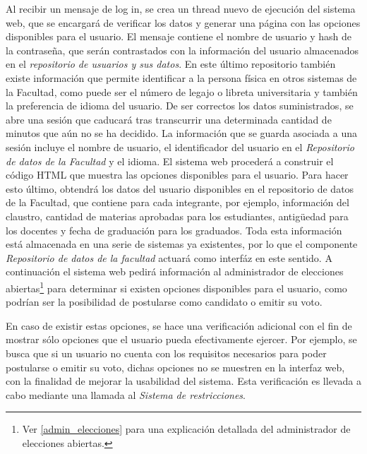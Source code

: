 Al recibir un mensaje de log in, se crea un thread nuevo de ejecución del sistema web, que se encargará de verificar los datos y generar una página con las opciones disponibles para el usuario. 
El mensaje contiene el nombre de usuario y hash de la contraseña, que serán contrastados con la información del usuario almacenados en el \emph{repositorio de usuarios y sus datos}. En este último repositorio también existe información que permite identificar a la persona física en otros sistemas de la Facultad, como puede ser el número de legajo o libreta universitaria y también la preferencia de idioma del usuario. 
De ser correctos los datos suministrados, se abre una sesión que caducará tras transcurrir una determinada cantidad de minutos que aún no se ha decidido.
La información que se guarda asociada a una sesión incluye el nombre de usuario, el identificador del usuario en el \emph{Repositorio de datos de la Facultad} y el idioma.
El sistema web procederá a construir el código HTML que muestra las opciones disponibles para el usuario. Para hacer esto último, obtendrá los datos del usuario disponibles en el repositorio de datos de la Facultad, que contiene para cada integrante, por ejemplo, información del claustro, cantidad de materias aprobadas para los estudiantes, antigüedad para los docentes y fecha de graduación para los graduados. Toda esta información está almacenada en una serie de sistemas ya existentes, por lo que el componente \emph{Repositorio de datos de la facultad} actuará como interfáz en este sentido.
A continuación el sistema web pedirá información al administrador de elecciones abiertas\footnote{Ver \ref{admin_elecciones} para una explicación detallada del administrador de elecciones abiertas.} para determinar si existen opciones disponibles para el usuario, como podrían ser la posibilidad de postularse como candidato o emitir su voto.


En caso de existir estas opciones, se hace una verificación adicional con el fin de mostrar sólo opciones que el usuario pueda efectivamente ejercer.  
Por ejemplo, se busca que si un usuario no cuenta con los requisitos necesarios para poder postularse o emitir su voto, dichas opciones no se muestren en la interfaz web, con la finalidad de mejorar la usabilidad del sistema. 
Esta verificación es llevada a cabo mediante una llamada al \emph{Sistema de restricciones}.

